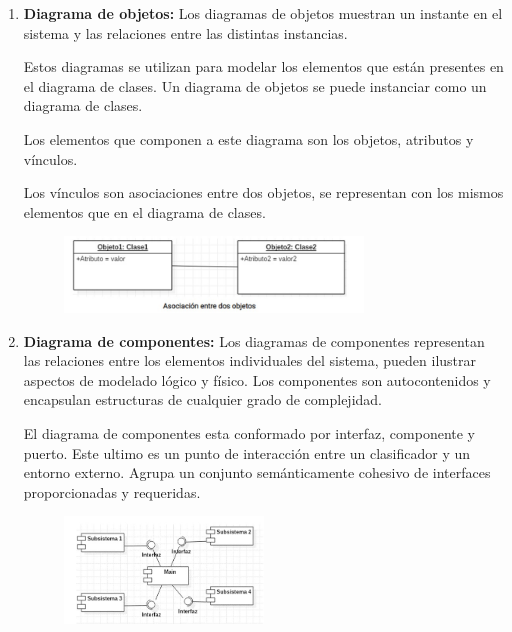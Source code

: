 \documentclass[12pt]{article}
\begin{document}
\begin{enumerate}[label = \arabic{enumi}]
\begin{enumerate}[label=\arabic{enumi}.\arabic{enumii}]
      \item \textbf{Diagrama de objetos:} Los diagramas de objetos muestran un instante en el sistema y las relaciones entre las distintas instancias. 
      
      Estos diagramas se utilizan para modelar los elementos que están presentes en el diagrama de clases. Un diagrama de objetos se puede instanciar como un diagrama de clases.
      
      Los elementos que componen a este diagrama son los objetos, atributos y vínculos.
      
      Los vínculos son asociaciones entre dos objetos, se representan con los mismos elementos que en el diagrama de clases.

      \begin{figure}[ht]
        \includegraphics[width = 0.75\textwidth, center]{objeto.jpg}
      \end{figure}
      
      \item \textbf{Diagrama de componentes:} Los diagramas de componentes representan las relaciones entre los elementos individuales del sistema, pueden ilustrar aspectos de modelado lógico y físico. Los componentes son autocontenidos y encapsulan estructuras de cualquier grado de complejidad.
      
      El diagrama de componentes esta conformado por interfaz, componente y puerto. Este ultimo es un punto de interacción entre un clasificador y un entorno externo. Agrupa un conjunto semánticamente cohesivo de interfaces proporcionadas y requeridas.

      \begin{figure}[ht]
        \includegraphics[width = 0.5\textwidth, center]{componente.jpg}
      \end{figure}
      

\end{enumerate}
\end{enumerate}
\end{document}
